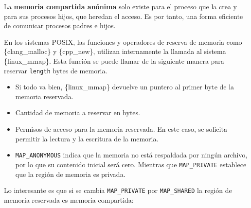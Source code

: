 La \textbf{memoria compartida anónima}{} solo existe para el proceso que
la crea y para sus procesos hijos, que heredan el acceso. Es por tanto,
una forma eficiente de comunicar procesos padres e hijos.

En los sistemas POSIX, las funciones y operadores de reserva de memoria
como \{clang\_malloc\} y \{cpp\_new\}, utilizan internamente la llamada
al sistema \{linux\_mmap\}. Esta función se puede llamar de la siguiente
manera para reservar \texttt{length} bytes de memoria.

\begin{Shaded}
\begin{Highlighting}[]
\OperatorTok{*}\OperatorTok{=}\OperatorTok{(} 
\OperatorTok{,}
\OperatorTok{,}     
\OperatorTok{|}\OperatorTok{,}      
\OperatorTok{|}\OperatorTok{,} 
    \OperatorTok{{-}}\OperatorTok{,}
\OperatorTok{);}
\end{Highlighting}
\end{Shaded}

\begin{itemize}
\item
  Si todo va bien, \{linux\_mmap\} devuelve un puntero al primer byte de
  la memoria reservada.
\item
  Cantidad de memoria a reservar en bytes.
\item
  Permisos de acceso para la memoria reservada. En este caso, se
  solicita permitir la lectura y la escritura de la memoria.
\item
  \texttt{MAP\_ANONYMOUS} indica que la memoria no está respaldada por
  ningún archivo, por lo que su contenido inicial será cero. Mientras
  que \texttt{MAP\_PRIVATE} establece que la región de memoria es
  privada.
\end{itemize}

Lo interesante es que si se cambia \texttt{MAP\_PRIVATE} por
\texttt{MAP\_SHARED} la región de memoria reservada es memoria
compartida:

\begin{Shaded}
\begin{Highlighting}[]
\OperatorTok{*}\OperatorTok{=}\OperatorTok{(}
\OperatorTok{,}
\OperatorTok{,}
\OperatorTok{|}\OperatorTok{,}
\OperatorTok{|}\OperatorTok{,} 
    \OperatorTok{{-}}\OperatorTok{,}
\OperatorTok{);}
\end{Highlighting}
\end{Shaded}

